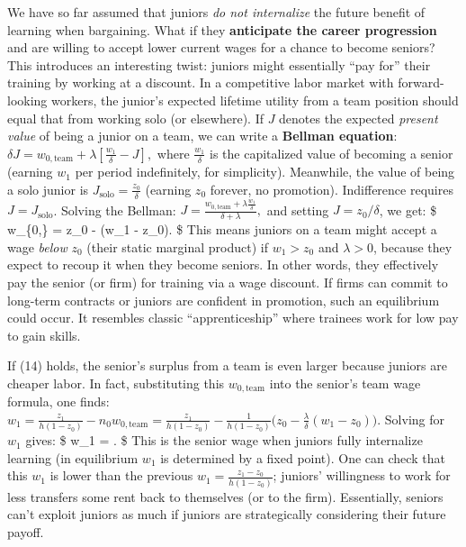 \documentclass[12pt]{article}
\begin{document}
We have so far assumed that juniors \emph{do not internalize} the future
benefit of learning when bargaining. What if they \textbf{anticipate the
career progression} and are willing to accept lower current wages for a
chance to become seniors? This introduces an interesting twist: juniors
might essentially ``pay for'' their training by working at a discount.
In a competitive labor market with forward-looking workers, the junior's
expected lifetime utility from a team position should equal that from
working solo (or elsewhere). If \(J\) denotes the expected \emph{present
value} of being a junior on a team, we can write a \textbf{Bellman
equation}:
\(\delta J = w_{0,\text{team}} + \lambda [\frac{w_1}{\delta} - J],\)
where \(\frac{w_1}{\delta}\) is the capitalized value of becoming a
senior (earning \(w_1\) per period indefinitely, for simplicity).
Meanwhile, the value of being a solo junior is
\(J_{\text{solo}} = \frac{z_0}{\delta}\) (earning \(z_0\) forever, no
promotion). Indifference requires \(J = J_{\text{solo}}\). Solving the
Bellman:
\(J = \frac{w_{0,\text{team}} + \lambda \frac{w_1}{\delta}}{\delta + \lambda},\)
and setting \(J = z_0/\delta\), we get: \$ w\_\{0,\} = z\_0 -
\frac{\lambda}{\delta}(w\_1 - z\_0). \$ This means juniors on a
team might accept a wage \emph{below} \(z_0\) (their static marginal
product) if \(w_1 > z_0\) and \(\lambda>0\), because they expect to
recoup it when they become seniors. In other words, they effectively pay
the senior (or firm) for training via a wage discount. If firms can
commit to long-term contracts or juniors are confident in promotion,
such an equilibrium could occur. It resembles classic ``apprenticeship''
where trainees work for low pay to gain skills.

If (14) holds, the senior's surplus from a team is even larger because
juniors are cheaper labor. In fact, substituting this
\(w_{0,\text{team}}\) into the senior's team wage formula, one finds:
\(w_1 = \frac{z_1}{h(1-z_0)} - n_0 w_{0,\text{team}} = \frac{z_1}{h(1-z_0)} - \frac{1}{h(1-z_0)}\Big(z_0 - \frac{\lambda}{\delta}(w_1 - z_0)\Big).\)
Solving for \(w_1\) gives: \$ w\_1 =
.
\$ This is the senior wage when juniors fully internalize
learning (in equilibrium \(w_1\) is determined by a fixed point). One
can check that this \(w_1\) is lower than the previous
\(w_1 = \frac{z_1 - z_0}{h(1-z_0)}\); juniors' willingness to work for
less transfers some rent back to themselves (or to the firm).
Essentially, seniors can't exploit juniors as much if juniors are
strategically considering their future payoff.
\end{document}

